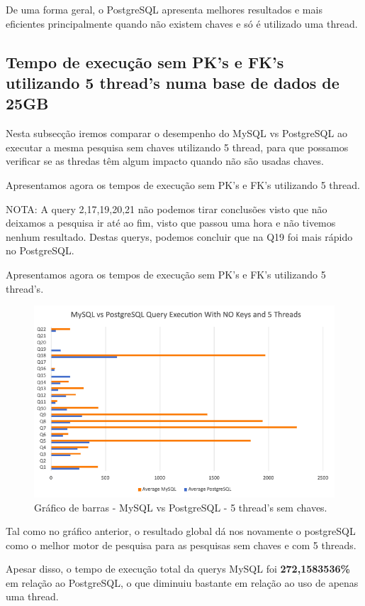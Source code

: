 \documentclass{article}
\begin{document}
De uma forma geral, o PostgreSQL apresenta melhores resultados e mais eficientes principalmente quando não existem chaves e só é utilizado uma thread.

\clearpage
\subsection{Tempo de execução sem PK's e FK's utilizando 5 thread's numa base
de dados de 25GB}


Nesta subsecção iremos comparar o desempenho do MySQL vs PostgreSQL ao executar a mesma pesquisa sem chaves utilizando 5 thread, para que possamos verificar se as thredas têm algum impacto quando não são usadas chaves.

Apresentamos agora os tempos de execução sem PK's e FK's utilizando 5 thread.

NOTA: A query 2,17,19,20,21 não podemos tirar conclusões visto que não deixamos a pesquisa ir até ao fim, visto que passou uma hora e não tivemos nenhum resultado. Destas querys, podemos concluir que na Q19 foi mais rápido no PostgreSQL.

Apresentamos agora os tempos de execução sem PK's e FK's utilizando 5 thread's.
\begin{figure}[H]
  \centering
  \includegraphics[width=\textwidth]{Graphs/mysqlvspostgres_withoutkeys_fivethreads.png}
  \caption{Gráfico de barras - MySQL vs PostgreSQL - 5 thread's sem chaves.}
  \label{fig:PKCreation2}
\end{figure}

Tal como no gráfico anterior, o resultado global dá nos novamente o postgreSQL como o melhor motor de pesquisa para as pesquisas sem chaves e com 5 threads.

Apesar disso, o tempo de execução total da querys MySQL foi \textbf{272,1583536\%} em relação ao PostgreSQL, o que diminuiu bastante em relação ao uso de apenas uma thread.
\end{document}
